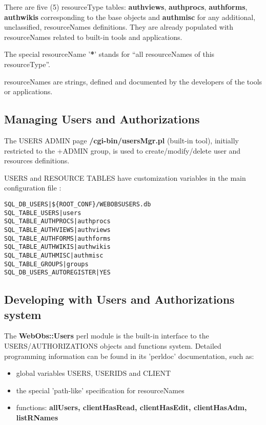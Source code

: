 There are five (5) resourceType tables: \textbf{authviews}, \textbf{authprocs}, \textbf{authforms}, \textbf{authwikis} corresponding to the base \webobs objects 
and \textbf{authmisc} for any additional, unclassified, resourceNames definitions. They are already populated with resourceNames related to \webobs built-in tools and applications.

The special resourceName '\textbf{*}' stands for ``all resourceNames of this resourceType''.

resourceNames are strings, defined and documented by the developers of the \webobs tools or applications.

\subsection{Managing Users and Authorizations}

The USERS ADMIN page \textbf{/cgi-bin/usersMgr.pl} (built-in tool), initially restricted to the +ADMIN group, is used to create/modify/delete user and resources definitions.

USERS and RESOURCE TABLES have customization variables in the main configuration file :

\begin{lstlisting}[title=\wofile{WEBOBS.rc} (excerpt)]
SQL_DB_USERS|${ROOT_CONF}/WEBOBSUSERS.db
SQL_TABLE_USERS|users
SQL_TABLE_AUTHPROCS|authprocs
SQL_TABLE_AUTHVIEWS|authviews
SQL_TABLE_AUTHFORMS|authforms
SQL_TABLE_AUTHWIKIS|authwikis
SQL_TABLE_AUTHMISC|authmisc
SQL_TABLE_GROUPS|groups
SQL_DB_USERS_AUTOREGISTER|YES
\end{lstlisting}

\subsection{Developing with Users and Authorizations system}

The \textbf{WebObs::Users} perl module is the built-in interface to the USERS/AUTHORIZATIONS objects and functions system.
Detailed programming information can be found in its 'perldoc' documentation, such as:

\begin{itemize}
\item   global variables USERS, USERIDS and CLIENT
\item   the special 'path-like' specification for resourceNames
\item   functions: \textbf{allUsers, clientHasRead, clientHasEdit, clientHasAdm, listRNames}
\end{itemize}

